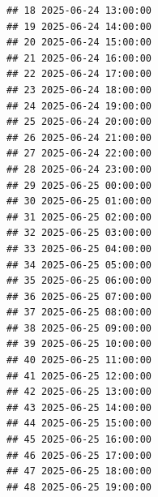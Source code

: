 \documentclass[
]{article}
\newenvironment{Shaded}{\begin{snugshade}}{\end{snugshade}}
\newcommand{\AttributeTok}[1]{\textcolor[rgb]{0.13,0.29,0.53}{#1}}
\newcommand{\CommentTok}[1]{\textcolor[rgb]{0.56,0.35,0.01}{\textit{#1}}}
\newcommand{\FunctionTok}[1]{\textcolor[rgb]{0.13,0.29,0.53}{\textbf{#1}}}
\newcommand{\NormalTok}[1]{#1}
\newcommand{\OtherTok}[1]{\textcolor[rgb]{0.56,0.35,0.01}{#1}}
\newcommand{\SpecialCharTok}[1]{\textcolor[rgb]{0.81,0.36,0.00}{\textbf{#1}}}
\newcommand{\StringTok}[1]{\textcolor[rgb]{0.31,0.60,0.02}{#1}}
\begin{document}
\begin{verbatim}
## 18 2025-06-24 13:00:00
## 19 2025-06-24 14:00:00
## 20 2025-06-24 15:00:00
## 21 2025-06-24 16:00:00
## 22 2025-06-24 17:00:00
## 23 2025-06-24 18:00:00
## 24 2025-06-24 19:00:00
## 25 2025-06-24 20:00:00
## 26 2025-06-24 21:00:00
## 27 2025-06-24 22:00:00
## 28 2025-06-24 23:00:00
## 29 2025-06-25 00:00:00
## 30 2025-06-25 01:00:00
## 31 2025-06-25 02:00:00
## 32 2025-06-25 03:00:00
## 33 2025-06-25 04:00:00
## 34 2025-06-25 05:00:00
## 35 2025-06-25 06:00:00
## 36 2025-06-25 07:00:00
## 37 2025-06-25 08:00:00
## 38 2025-06-25 09:00:00
## 39 2025-06-25 10:00:00
## 40 2025-06-25 11:00:00
## 41 2025-06-25 12:00:00
## 42 2025-06-25 13:00:00
## 43 2025-06-25 14:00:00
## 44 2025-06-25 15:00:00
## 45 2025-06-25 16:00:00
## 46 2025-06-25 17:00:00
## 47 2025-06-25 18:00:00
## 48 2025-06-25 19:00:00
\end{verbatim}

\begin{Shaded}
\end{Shaded}
\end{document}
